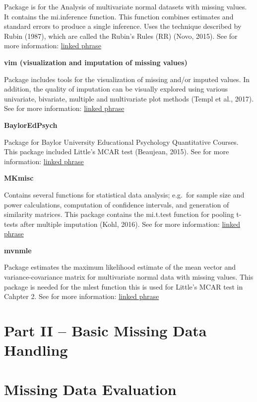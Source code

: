 \documentclass[]{book}
\begin{document}
Package is for the Analysis of multivariate normal datasets with missing
values. It contains the mi.inference function. This function combines
estimates and standard errors to produce a single inference. Uses the
technique described by Rubin (1987), which are called the Rubin's Rules
(RR) (Novo, 2015). See for more information:
\href{https://cran.r-project.org/web/packages/norm/index.html}{linked
phrase}

\textbf{vim (visualization and imputation of missing values)}

Package includes tools for the visualization of missing and/or imputed
values. In addition, the quality of imputation can be visually explored
using various univariate, bivariate, multiple and multivariate plot
methods (Templ et al., 2017). See for more information:
\href{https://cran.r-project.org/web/packages/mi/index.html}{linked
phrase}

\textbf{BaylorEdPsych}

Package for Baylor University Educational Psychology Quantitative
Courses. This package included Little's MCAR test (Beaujean, 2015). See
for more information:
\href{https://cran.r-project.org/web/packages/BaylorEdPsych/index.html}{linked
phrase}

\textbf{MKmisc}

Contains several functions for statistical data analysis; e.g.~for
sample size and power calculations, computation of confidence intervals,
and generation of similarity matrices. This package contains the
mi.t.test function for pooling t-tests after multiple imputation (Kohl,
2016). See for more information:
\href{https://cran.r-project.org/web/packages/MKmisc/index.html}{linked
phrase}

\textbf{mvnmle}

Package estimates the maximum likelihood estimate of the mean vector and
variance-covariance matrix for multivariate normal data with missing
values. This package is needed for the mlest function this is used for
Little's MCAR test in Cahpter 2. See for more information:
\href{https://cran.r-project.org/web/packages/mvnmle/index.html}{linked
phrase}

\chapter*{Part II -- Basic Missing Data
Handling}\label{part-ii-basic-missing-data-handling}

\chapter{Missing Data Evaluation}\label{missing-data-evaluation}
\end{document}
